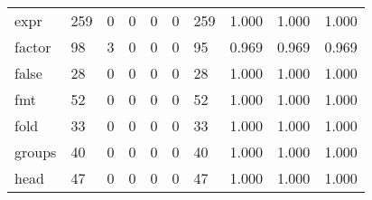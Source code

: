 \begin{longtable}{lp{1.3cm}p{1.3cm}p{1.3cm}p{1.3cm}p{1.3cm}p{1.3cm}p{1.3cm}p{1.3cm}p{1.3cm}}
expr      &                    259 &                                             0 &                                            0 &                                           0 &                                            0 &                                        259 &                                1.000 &                                  1.000 &                                1.000 \\
factor    &                     98 &                                             3 &                                            0 &                                           0 &                                            0 &                                         95 &                                0.969 &                                  0.969 &                                0.969 \\
false     &                     28 &                                             0 &                                            0 &                                           0 &                                            0 &                                         28 &                                1.000 &                                  1.000 &                                1.000 \\
fmt       &                     52 &                                             0 &                                            0 &                                           0 &                                            0 &                                         52 &                                1.000 &                                  1.000 &                                1.000 \\
fold      &                     33 &                                             0 &                                            0 &                                           0 &                                            0 &                                         33 &                                1.000 &                                  1.000 &                                1.000 \\
groups    &                     40 &                                             0 &                                            0 &                                           0 &                                            0 &                                         40 &                                1.000 &                                  1.000 &                                1.000 \\
head      &                     47 &                                             0 &                                            0 &                                           0 &                                            0 &                                         47 &                                1.000 &                                  1.000 &                                1.000 \\

\end{longtable}
